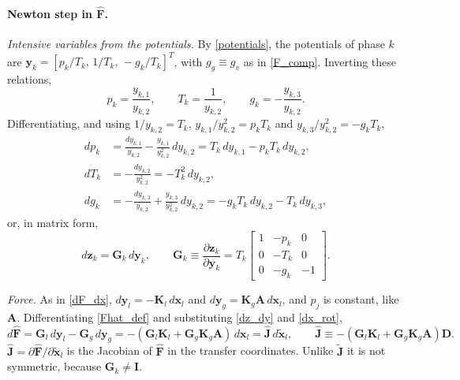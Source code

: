 \paragraph{Newton step in $\hat{\boldsymbol{F}}$.}
\emph{Intensive variables from the potentials.} By \eqref{potentials}, the potentials of phase $k$ are $\boldsymbol{y}_k=[p_k/T_k,\,1/T_k,\,-g_k/T_k]^T$, with $g_g\equiv g_v$ as in \eqref{F_comp}. Inverting these relations,
\begin{equation}
p_k=\frac{y_{k,1}}{y_{k,2}},\qquad T_k=\frac1{y_{k,2}},\qquad g_k=-\frac{y_{k,3}}{y_{k,2}} .
\end{equation}
Differentiating, and using $1/y_{k,2}=T_k$, $y_{k,1}/y_{k,2}^2=p_kT_k$ and $y_{k,3}/y_{k,2}^2=-g_kT_k$,
\begin{equation}
\begin{aligned}
dp_k&=\frac{dy_{k,1}}{y_{k,2}}-\frac{y_{k,1}}{y_{k,2}^2}\,dy_{k,2}=T_k\,dy_{k,1}-p_kT_k\,dy_{k,2},\\
dT_k&=-\frac{dy_{k,2}}{y_{k,2}^2}=-T_k^2\,dy_{k,2},\\
dg_k&=-\frac{dy_{k,3}}{y_{k,2}}+\frac{y_{k,3}}{y_{k,2}^2}\,dy_{k,2}=-g_kT_k\,dy_{k,2}-T_k\,dy_{k,3},
\end{aligned}
\end{equation}
or, in matrix form,
\begin{equation}\label{dz_dy}
d\boldsymbol{z}_k=\boldsymbol{G}_k\,d\boldsymbol{y}_k,\qquad
\boldsymbol{G}_k\equiv\frac{\partial\boldsymbol{z}_k}{\partial\boldsymbol{y}_k}=T_k\begin{bmatrix}1&-p_k&0\\0&-T_k&0\\0&-g_k&-1\end{bmatrix}.
\end{equation}

\emph{Force.} As in \eqref{dF_dx}, $d\boldsymbol{y}_l=-\boldsymbol{K}_l\,d\boldsymbol{x}_l$ and $d\boldsymbol{y}_g=\boldsymbol{K}_g\boldsymbol{A}\,d\boldsymbol{x}_l$, and $p_{j}$ is constant, like $\boldsymbol{A}$. Differentiating \eqref{Fhat_def} and substituting \eqref{dz_dy} and \eqref{dx_rot},
\begin{equation}\label{dFhat}
d\hat{\boldsymbol{F}}=\boldsymbol{G}_l\,d\boldsymbol{y}_l-\boldsymbol{G}_g\,d\boldsymbol{y}_g=-(\boldsymbol{G}_l\boldsymbol{K}_l+\boldsymbol{G}_g\boldsymbol{K}_g\boldsymbol{A})\,d\boldsymbol{x}_l=\hat{\boldsymbol{J}}\,d\tilde{\boldsymbol{x}}_l,\qquad
\hat{\boldsymbol{J}}\equiv-(\boldsymbol{G}_l\boldsymbol{K}_l+\boldsymbol{G}_g\boldsymbol{K}_g\boldsymbol{A})\boldsymbol{D} .
\end{equation}
$\hat{\boldsymbol{J}}=\partial\hat{\boldsymbol{F}}/\partial\tilde{\boldsymbol{x}}_l$ is the Jacobian of $\hat{\boldsymbol{F}}$ in the transfer coordinates. Unlike $\tilde{\boldsymbol{J}}$ it is not symmetric, because $\boldsymbol{G}_k\neq\boldsymbol{I}$.

